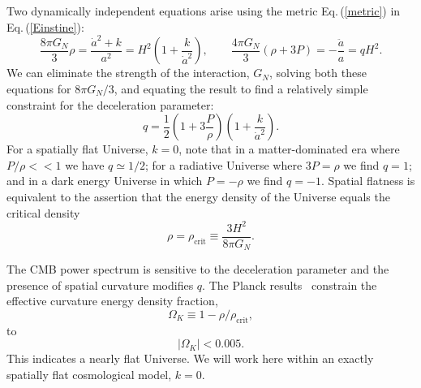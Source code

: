 \documentclass[universe,article,submit,moreauthors,pdftex,a4paper]{Definitions/mdpi}
\newcommand{\beqn}{\begin{equation}}
\newcommand{\eeqn}{\end{equation}}
\newcommand{\req}[1]{Eq.\,(\ref{#1})}
\begin{document}
Two dynamically independent equations arise using the metric \req{metric} in \req{Einstine}:
\beqn\label{hubble}
\frac{8\pi G_N}{3} \rho =  \frac{\dot a^2+k}{a^2}
=H^2\left( 1+\frac { k }{\dot a^2}\right),
\qquad
\frac{4\pi G_N}{3} (\rho+3P)  =-\frac{\ddot a}{a}=qH^2.
\eeqn
We can eliminate the strength of the interaction, $G_N$,  solving both these equations for ${8\pi G_N}/{3}$, and equating the result to find a relatively simple constraint for the deceleration parameter:
\beqn\label{qparam}
q=\frac 1 2 \left(1+3\frac{P}{\rho}\right)\left(1+\frac{k}{\dot a^2}\right).
\eeqn
For a spatially flat Universe, $k=0$, note that in a  matter-dominated era where $P/\rho<<1$ we have $q\simeq 1/2$; for a radiative Universe where $3P=\rho$ we find $q= 1 $; and  in a dark energy Universe in which $P=-\rho$  we find $q=-1$.  Spatial flatness is equivalent to the assertion that the energy density of the Universe equals the critical density
\begin{equation}\label{crit_density}
\rho=\rho_{\text{crit}}\equiv \frac{3H^2}{8\pi G_N}.
\end{equation}

 The CMB power spectrum is sensitive to the  deceleration parameter  and the presence of spatial curvature modifies $q$. The Planck results~\cite{Planck:2013pxb,Planck:2015fie,Planck:2018vyg} constrain  the effective curvature energy density fraction,
\begin{equation}
\Omega_K\equiv1-\rho/\rho_{\text{crit}},
\end{equation}
to
\begin{equation}
|\Omega_K|<0.005.
\end{equation}
This indicates a nearly flat Universe. We will work here within an exactly spatially flat cosmological model, $k=0$.  
\end{document}

